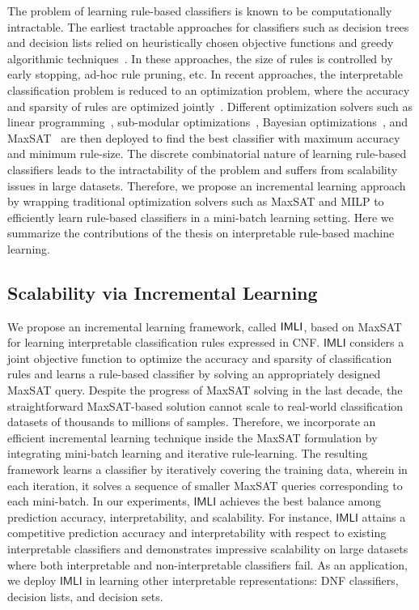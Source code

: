 The problem of learning rule-based classifiers is known to be computationally intractable. The earliest tractable approaches for classifiers such as decision trees and decision lists relied on heuristically chosen objective functions and greedy algorithmic techniques~\cite{ClarkN1989,CohenS1999,quinlan2014}. In these approaches, the size of rules is controlled by early stopping,  ad-hoc rule pruning, etc. In recent approaches, the interpretable classification problem is reduced to an optimization problem, where the accuracy and sparsity of rules are optimized jointly~\cite{lakkaraju2016interpretable,narodytska2018learning}. Different optimization solvers such as linear programming~\cite{malioutov2013exact}, sub-modular optimizations~\cite{lakkaraju2016interpretable}, Bayesian optimizations~\cite{letham2015interpretable}, and MaxSAT~\cite{malioutov2018mlic} are then deployed to find the best classifier with maximum accuracy and minimum rule-size. The discrete combinatorial nature of learning rule-based classifiers leads to the intractability of the problem and suffers from scalability issues in large datasets. Therefore, we propose an incremental learning approach by wrapping traditional optimization solvers such as MaxSAT and MILP to efficiently learn rule-based classifiers in a mini-batch learning setting.  Here we summarize the contributions of the thesis on interpretable rule-based machine learning.

\subsection{Scalability via Incremental Learning}
We propose an incremental learning framework, called $ \mathsf{IMLI} $,  based on MaxSAT for learning interpretable classification rules expressed in CNF. $ \mathsf{IMLI} $ considers a joint objective function to optimize the accuracy and sparsity of classification rules and learns a rule-based classifier by solving an appropriately designed MaxSAT query. Despite the progress of MaxSAT solving in the last decade, the straightforward MaxSAT-based solution cannot scale to real-world classification datasets of thousands to millions of samples. Therefore, we incorporate an efficient incremental learning technique inside the MaxSAT formulation by integrating mini-batch learning and iterative rule-learning. The resulting framework learns a classifier by iteratively covering the training data, wherein in each iteration, it solves a sequence of smaller MaxSAT queries corresponding to each mini-batch. In our experiments, $ \mathsf{IMLI} $ achieves the best balance among prediction accuracy, interpretability, and scalability. For instance, $ \mathsf{IMLI} $ attains a competitive prediction accuracy and interpretability with respect to existing interpretable classifiers and demonstrates impressive scalability on large datasets where both interpretable and non-interpretable classifiers fail. As an application, we deploy $ \mathsf{IMLI} $ in learning other interpretable representations: DNF classifiers, decision lists, and decision sets.
	
